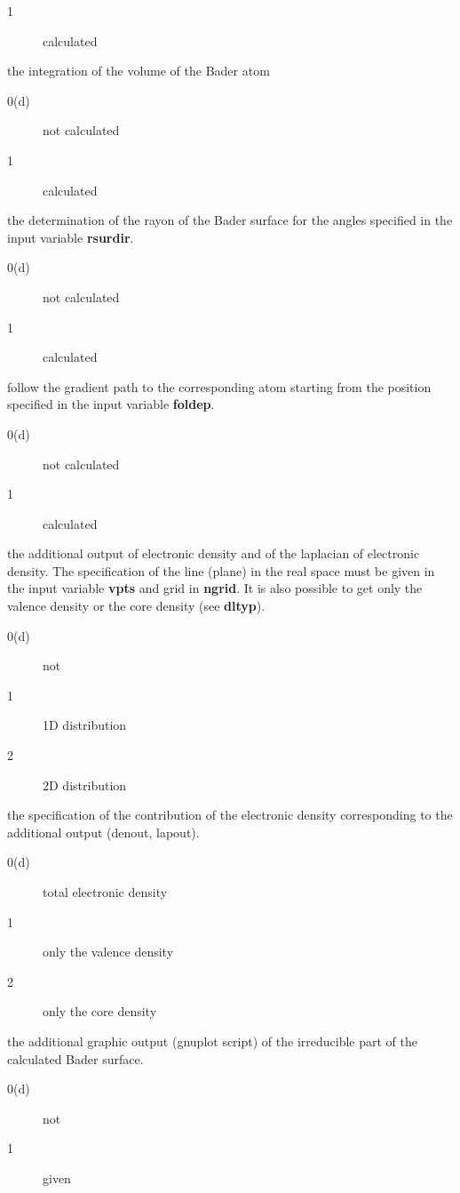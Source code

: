 \documentclass[11pt]{article}
\begin{document}
\begin{description}
\begin{description}
    \item [1] calculated
  \end{description} 
\item [ivol] the integration of the volume of the Bader atom    
  \begin{description}
    \item [0(d)] not calculated
    \item [1] calculated
  \end{description} 
\item [rsur] the determination of the rayon of the Bader surface for
the angles specified in the input variable {\bf rsurdir}.    
  \begin{description}
    \item [0(d)] not calculated
    \item [1] calculated
  \end{description} 
\item [follow] follow the gradient path to the corresponding atom
starting from the position specified in the input variable {\bf foldep}.    
  \begin{description}
    \item [0(d)] not calculated
    \item [1] calculated
  \end{description} 
\item [denout,lapout] the additional output of electronic density
and of the laplacian of electronic density. The specification of the
line (plane) in the real space must be given in the input variable
{\bf vpts} and grid in {\bf ngrid}. It is also possible to get only the
valence density or the core density (see {\bf dltyp}).     
  \begin{description}
    \item [0(d)] not 
    \item [1] 1D distribution
    \item [2] 2D distribution    
  \end{description} 
\item [dltyp] the specification of the contribution of the electronic
density corresponding to the additional output (denout, lapout). 
  \begin{description}
    \item [0(d)] total electronic density
    \item [1] only the valence density
    \item [2] only the core density
  \end{description} 
\item [gpsurf]  the additional graphic output (gnuplot script) of the
irreducible part of the calculated Bader surface.
  \begin{description}
    \item [0(d)] not
    \item [1] given
  \end{description} 
\end{description}
\end{document}
